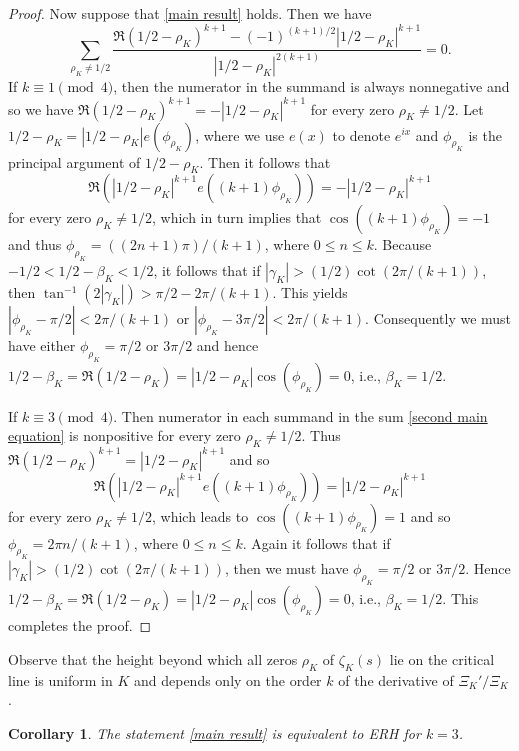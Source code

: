 \documentclass[12pt]{amsart}
\numberwithin{equation}{section}
\theoremstyle{myplain}
\theoremstyle{mydefinition}
\theoremstyle{plain}
\newtheorem{corollary}[theorem]{Corollary}
\theoremstyle{definition}
\renewcommand{\leq}{\leqslant}
\begin{document}
\begin{proof}
Now suppose that \eqref{main result} holds. Then we have 
\begin{equation} \label{second main equation}
\sum_{\rho_K \neq 1/2} \frac{\Re(1/2 - \rho_K)^{k + 1} - (-1)^{(k + 1)/2}|1/2 - \rho_K|^{k + 1}}{|1/2 - \rho_K|^{2(k + 1)}} = 0.
\end{equation}
If $k \equiv 1 \pmod{4}$, then the numerator in the summand is always nonnegative and so we have $\Re(1/2 - \rho_K)^{k + 1} = - |1/2 - \rho_K|^{k + 1}$ for every zero $\rho_K \neq 1/2$. Let $1/2 - \rho_K = |1/2 - \rho_K| e({ \phi_{\rho_K}})$, where we use $e(x)$ to denote $e^{ix}$ and $\phi_{\rho_K}$ is the principal argument of $1/2 - \rho_K$. Then it follows that
\[
\Re \left( \left|1/2 - \rho_K \right|^{k + 1} e({(k + 1) \phi_{\rho_K}}) \right)= - \left|1/2 - \rho_K \right|^{k + 1}
\]
for every zero $\rho_K \neq 1/2$, which in turn implies that $\cos((k + 1) \phi_{\rho_K}) = -1$ and thus $\phi_{\rho_K} =((2n + 1) \pi)/(k + 1)$, where $0 \leq n \leq  k$. Because $-1/2 < 1/2 - \beta_K < 1/2$, it follows that if $|\gamma_K|> (1/2) \cot (2 \pi/(k + 1))$, then $\tan^{-1}(2|\gamma_K|) > \pi/2 - 2\pi/(k + 1)$. This yields $|\phi_{\rho_K} - \pi/2| < 2 \pi/(k + 1)$  or $|\phi_{\rho_K} - 3 \pi/2| < 2 \pi/(k + 1)$. Consequently we must have either $\phi_{\rho_K} = \pi/2$ or $3 \pi/2$  and hence $1/2- \beta_K =  \Re(1/2  -\rho_K) = |1/2 - \rho_K|\cos(\phi_{\rho_K}) = 0$, i.e.,  $\beta_K = 1/2$.

If $k \equiv 3 \pmod{4}$. Then numerator in each summand in the sum \eqref{second main equation} is nonpositive for every zero $\rho_K \neq 1/2$. Thus $\Re (1/2 - \rho_K)^{k + 1} = |1/2 - \rho_K|^{k + 1}$ and so
\[
\Re \left(\left| 1/2 - \rho_K \right|^{k + 1} e({(k + 1) \phi_{\rho_K}}) \right)=  \left| 1/2 - \rho_K \right|^{k + 1}
\]
for every zero $\rho_K \neq 1/2$, which leads to $\cos((k + 1) \phi_{\rho_K}) = 1$ and so $\phi_{\rho_K} = 2\pi n/(k + 1)$, where $0 \leq n \leq k$. Again it follows that if $|\gamma_K| > (1/2) \cot (2 \pi/(k + 1))$, then we must have $\phi_{\rho_K} =  \pi/2$ or $3 \pi/2$. Hence $1/2 - \beta_K = \Re(1/2 - \rho_K) = |1/2 - \rho_K| \cos (\phi_{\rho_K}) = 0$, i.e., $\beta_K = 1/2$. This completes the proof.
\end{proof}


Observe that the height beyond which all zeros $\rho_K$ of $\zeta_K(s)$ lie on the critical line is uniform in $K$ and depends only on the order $k$ of the derivative of $\Xi_K'/\Xi_K$.

\begin{corollary}
The statement \eqref{main result} is equivalent to ERH for $k = 3$.
\end{corollary}
\end{document}
